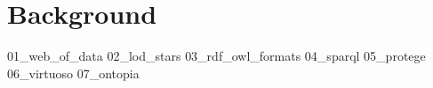 \chapter{Background}
\label{chp:background}

{01_web_of_data}%
{02_lod_stars}%
{03_rdf_owl_formats}%
{04_sparql}%
{05_protege}%
{06_virtuoso}%
{07_ontopia}%